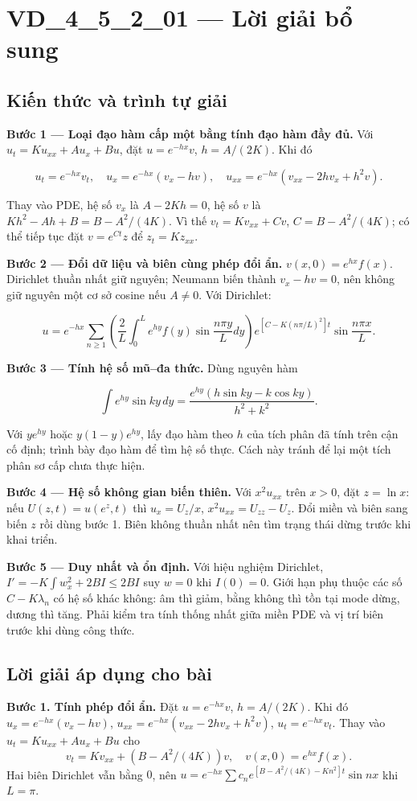 \documentclass[10pt,a4paper]{article}
\begin{document}
\section*{VD\_4\_5\_2\_01 — Lời giải bổ sung}
\subsection*{Kiến thức và trình tự giải}
\textbf{Bước 1 — Loại đạo hàm cấp một bằng tính đạo hàm đầy đủ.} Với $u_t=Ku_{xx}+Au_x+Bu$, đặt $u=e^{-hx}v$, $h=A/(2K)$. Khi đó


\[
u_t=e^{-hx}v_t,\quad u_x=e^{-hx}(v_x-hv),\quad
u_{xx}=e^{-hx}(v_{xx}-2hv_x+h^2v).
\]


Thay vào PDE, hệ số $v_x$ là $A-2Kh=0$, hệ số $v$ là $Kh^2-Ah+B=B-A^2/(4K)$. Vì thế $v_t=Kv_{xx}+Cv$, $C=B-A^2/(4K)$; có thể tiếp tục đặt $v=e^{Ct}z$ để $z_t=Kz_{xx}$.

\textbf{Bước 2 — Đổi dữ liệu và biên cùng phép đổi ẩn.} $v(x,0)=e^{hx}f(x)$. Dirichlet thuần nhất giữ nguyên; Neumann biến thành $v_x-hv=0$, nên không giữ nguyên một cơ sở cosine nếu $A\ne0$. Với Dirichlet:


\[
u=e^{-hx}\sum_{n\ge1}\left(\frac2L\int_0^Le^{hy}f(y)\sin\frac{n\pi y}Ldy\right)
e^{[C-K(n\pi/L)^2]t}\sin\frac{n\pi x}L.
\]


\textbf{Bước 3 — Tính hệ số mũ–đa thức.} Dùng nguyên hàm


\[
\int e^{hy}\sin ky\,dy
=\frac{e^{hy}(h\sin ky-k\cos ky)}{h^2+k^2}.
\]


Với $y e^{hy}$ hoặc $y(1-y)e^{hy}$, lấy đạo hàm theo $h$ của tích phân đã tính trên cận cố định; trình bày đạo hàm để tìm hệ số thực. Cách này tránh để lại một tích phân sơ cấp chưa thực hiện.

\textbf{Bước 4 — Hệ số không gian biến thiên.} Với $x^2u_{xx}$ trên $x>0$, đặt $z=\ln x$: nếu $U(z,t)=u(e^z,t)$ thì $u_x=U_z/x$, $x^2u_{xx}=U_{zz}-U_z$. Đổi miền và biên sang biến $z$ rồi dùng bước 1. Biên không thuần nhất nên tìm trạng thái dừng trước khi khai triển.

\textbf{Bước 5 — Duy nhất và ổn định.} Với hiệu nghiệm Dirichlet, $I'=-K\int w_x^2+2BI\le2BI$ suy $w=0$ khi $I(0)=0$. Giới hạn phụ thuộc các số $C-K\lambda_n$ có hệ số khác không: âm thì giảm, bằng không thì tồn tại mode dừng, dương thì tăng. Phải kiểm tra tính thống nhất giữa miền PDE và vị trí biên trước khi dùng công thức.
\subsection*{Lời giải áp dụng cho bài}
\textbf{Bước 1. Tính phép đổi ẩn.}
Đặt $u=e^{-hx}v$, $h=A/(2K)$. Khi đó $u_x=e^{-hx}(v_x-hv)$, $u_{xx}=e^{-hx}(v_{xx}-2hv_x+h^2v)$, $u_t=e^{-hx}v_t$. Thay vào $u_t=Ku_{xx}+Au_x+Bu$ cho
\[v_t=Kv_{xx}+(B-A^2/(4K))v,\quad v(x,0)=e^{hx}f(x).\]
Hai biên Dirichlet vẫn bằng $0$, nên $u=e^{-hx}\sum c_ne^{[B-A^2/(4K)-Kn^2]t}\sin nx$ khi $L=\pi$.
\end{document}
